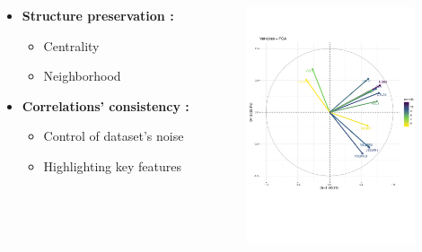 \documentclass[compress]{beamer}
\begin{document}
\begin{frame}
\begin{overprint}
  
\begin{columns}[c]
  \begin{column}{0.55\linewidth}
 \begin{itemize}
     \item \textbf{Structure preservation : }\\
     \begin{itemize}
         \item Centrality 
         \item Neighborhood
     \end{itemize}
 \end{itemize}
  \begin{itemize}
    \item   \textbf{Correlations' consistency : }\\
     \begin{itemize}
         \item Control of dataset's noise
         \item Highlighting key features 
     \end{itemize}
\end{itemize}
  \end{column}
  \begin{column}{0.45\linewidth}
       \begin{figure}
\centering
\includegraphics[height=7cm]{figures/methods/COR_CIRCLE.pdf}
  \end{figure}
  \end{column}
 \end{columns} 
  
 
  

\end{overprint}
\end{frame}
\end{document}
